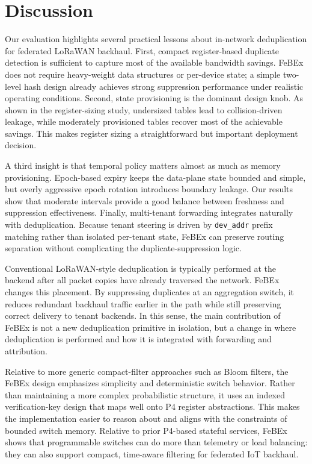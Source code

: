 \section{Discussion}
\label{sec:discussion}

Our evaluation highlights several practical lessons about in-network deduplication for federated LoRaWAN backhaul. First, compact register-based duplicate detection is sufficient to capture most of the available bandwidth savings. FeBEx does not require heavy-weight data structures or per-device state; a simple two-level hash design already achieves strong suppression performance under realistic operating conditions. Second, state provisioning is the dominant design knob. As shown in the register-sizing study, undersized tables lead to collision-driven leakage, while moderately provisioned tables recover most of the achievable savings. This makes register sizing a straightforward but important deployment decision.

A third insight is that temporal policy matters almost as much as memory provisioning. Epoch-based expiry keeps the data-plane state bounded and simple, but overly aggressive epoch rotation introduces boundary leakage. Our results show that moderate intervals provide a good balance between freshness and suppression effectiveness. Finally, multi-tenant forwarding integrates naturally with deduplication. Because tenant steering is driven by \texttt{dev\_addr} prefix matching rather than isolated per-tenant state, FeBEx can preserve routing separation without complicating the duplicate-suppression logic.

Conventional LoRaWAN-style deduplication is typically performed at the backend after all packet copies have already traversed the network. FeBEx changes this placement. By suppressing duplicates at an aggregation switch, it reduces redundant backhaul traffic earlier in the path while still preserving correct delivery to tenant backends. In this sense, the main contribution of FeBEx is not a new deduplication primitive in isolation, but a change in where deduplication is performed and how it is integrated with forwarding and attribution.

Relative to more generic compact-filter approaches such as Bloom filters, the FeBEx design emphasizes simplicity and deterministic switch behavior. Rather than maintaining a more complex probabilistic structure, it uses an indexed verification-key design that maps well onto P4 register abstractions. This makes the implementation easier to reason about and aligns with the constraints of bounded switch memory. Relative to prior P4-based stateful services, FeBEx shows that programmable switches can do more than telemetry or load balancing: they can also support compact, time-aware filtering for federated IoT backhaul.

